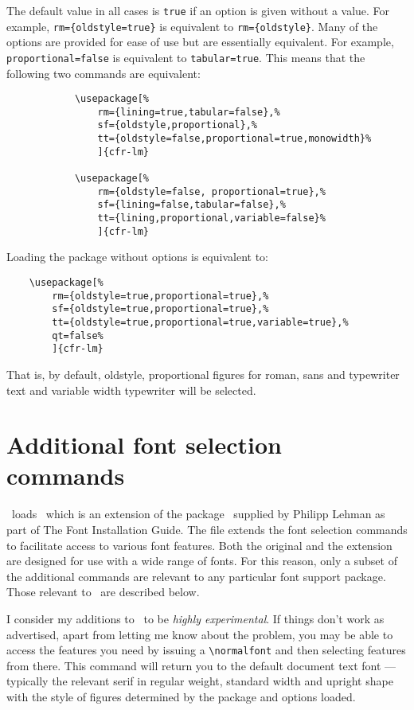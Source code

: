 \documentclass[11pt,british]{article}
\begin{document}
The default value in all cases is \verb|true| if an option is given without a value. For example, \verb|rm={oldstyle=true}| is equivalent to \verb|rm={oldstyle}|. Many of the options are provided for ease of use but are essentially equivalent. For example, \verb|proportional=false| is equivalent to \verb|tabular=true|. This means that the following two commands are equivalent:
		\begin{verbatim}
			\usepackage[%
				rm={lining=true,tabular=false},%
				sf={oldstyle,proportional},%
				tt={oldstyle=false,proportional=true,monowidth}%
				]{cfr-lm}
				
			\usepackage[%
				rm={oldstyle=false, proportional=true},%
				sf={lining=false,tabular=false},%
				tt={lining,proportional,variable=false}%
				]{cfr-lm}
		\end{verbatim}

Loading the package without options is equivalent to:
\begin{verbatim}
	\usepackage[%
		rm={oldstyle=true,proportional=true},%
		sf={oldstyle=true,proportional=true},%
		tt={oldstyle=true,proportional=true,variable=true},%
		qt=false%
		]{cfr-lm}
\end{verbatim}
That is, by default, oldstyle, proportional figures for roman, sans and typewriter text and variable width typewriter will be selected.
	
\section{Additional font selection commands}\label{sec:commands}

\ loads \ which is an extension of the package \ supplied by Philipp Lehman as part of The Font Installation Guide. The file extends the font selection commands to facilitate access to various font features. Both the original and the extension are designed for use with a wide range of fonts. For this reason, only a subset of the additional commands are relevant to any particular font support package. Those relevant to \ are described below.
	
I consider my additions to \ to be \emph{highly experimental}. If things don't work as advertised, apart from letting me know about the problem, you may be able to access the features you need by issuing a \verb|\normalfont| and then selecting features from there. This command will return you to the default document text font --- typically the relevant serif in regular weight, standard width and upright shape with the style of figures determined by the package and options loaded.
\end{document}

